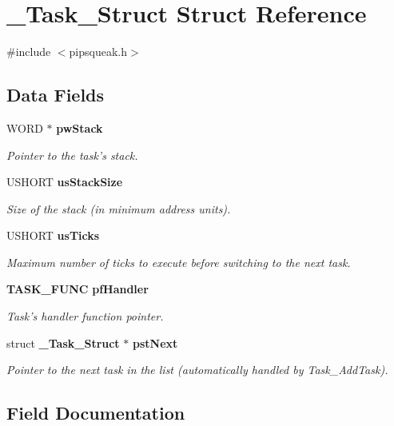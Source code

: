 \section{\_\-Task\_\-Struct Struct Reference}
\label{struct___task___struct}


{\ttfamily \#include $<$pipsqueak.h$>$}\subsection*{Data Fields}
\begin{DoxyCompactItemize}
\item 
WORD $\ast$ {\bf pwStack}
\begin{DoxyCompactList}\small\item\em Pointer to the task's stack. \item\end{DoxyCompactList}\item 
USHORT {\bf usStackSize}
\begin{DoxyCompactList}\small\item\em Size of the stack (in minimum address units). \item\end{DoxyCompactList}\item 
USHORT {\bf usTicks}
\begin{DoxyCompactList}\small\item\em Maximum number of ticks to execute before switching to the next task. \item\end{DoxyCompactList}\item 
{\bf TASK\_\-FUNC} {\bf pfHandler}
\begin{DoxyCompactList}\small\item\em Task's handler function pointer. \item\end{DoxyCompactList}\item 
struct {\bf \_\-Task\_\-Struct} $\ast$ {\bf pstNext}
\begin{DoxyCompactList}\small\item\em Pointer to the next task in the list (automatically handled by Task\_\-AddTask). \item\end{DoxyCompactList}\end{DoxyCompactItemize}


\subsection{Field Documentation}
